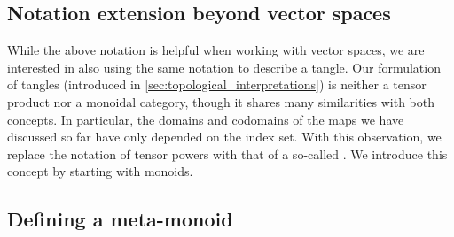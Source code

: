 \subsection{Notation extension beyond vector spaces}
\label{sec:monoidal_notation}


While the above notation is helpful when working with vector spaces, we are
interested in also using the same notation to describe a tangle. Our
formulation of tangles (introduced in
\cref{sec:topological_interpretations}) is neither a tensor product nor a
monoidal category, though it shares many similarities with both concepts. In
particular, the domains and codomains of the maps we have discussed so far have
only depended on the index set. With this observation, we replace the notation of
tensor powers with that of a so-called . We introduce this
concept by starting with monoids.

\subsection{Defining a meta-monoid}

